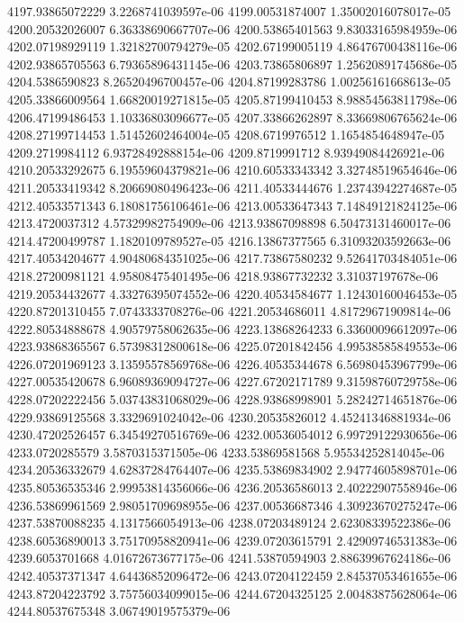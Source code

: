 {4197.93865072229 3.2268741039597e-06
4199.00531874007 1.35002016078017e-05
4200.20532026007 6.36338690667707e-06
4200.53865401563 9.83033165984959e-06
4202.07198929119 1.32182700794279e-05
4202.67199005119 4.86476700438116e-06
4202.93865705563 6.79365896431145e-06
4203.73865806897 1.25620891745686e-05
4204.5386590823 8.26520496700457e-06
4204.87199283786 1.00256161668613e-05
4205.33866009564 1.66820019271815e-05
4205.87199410453 8.98854563811798e-06
4206.47199486453 1.10336803096677e-05
4207.33866262897 8.33669806765624e-06
4208.27199714453 1.51452602464004e-05
4208.6719976512 1.1654854648947e-05
4209.2719984112 6.93728492888154e-06
4209.8719991712 8.93949084426921e-06
4210.20533292675 6.19559604379821e-06
4210.60533343342 3.32748519654646e-06
4211.20533419342 8.20669080496423e-06
4211.40533444676 1.23743942274687e-05
4212.40533571343 6.18081756106461e-06
4213.00533647343 7.14849121824125e-06
4213.4720037312 4.57329982754909e-06
4213.93867098898 6.50473131460017e-06
4214.47200499787 1.1820109789527e-05
4216.13867377565 6.31093203592663e-06
4217.40534204677 4.90480684351025e-06
4217.73867580232 9.52641703484051e-06
4218.27200981121 4.95808475401495e-06
4218.93867732232 3.31037197678e-06
4219.20534432677 4.33276395074552e-06
4220.40534584677 1.12430160046453e-05
4220.87201310455 7.0743333708276e-06
4221.20534686011 4.81729671909814e-06
4222.80534888678 4.90579758062635e-06
4223.13868264233 6.33600096612097e-06
4223.93868365567 6.57398312800618e-06
4225.07201842456 4.99538585849553e-06
4226.07201969123 3.13595578569768e-06
4226.40535344678 6.56980453967799e-06
4227.00535420678 6.96089369094727e-06
4227.67202171789 9.31598760729758e-06
4228.07202222456 5.03743831068029e-06
4228.93868998901 5.28242714651876e-06
4229.93869125568 3.3329691024042e-06
4230.20535826012 4.45241346881934e-06
4230.47202526457 6.34549270516769e-06
4232.00536054012 6.99729122930656e-06
4233.0720285579 3.5870315371505e-06
4233.53869581568 5.95534252814045e-06
4234.20536332679 4.62837284764407e-06
4235.53869834902 2.94774605898701e-06
4235.80536535346 2.99953814356066e-06
4236.20536586013 2.40222907558946e-06
4236.53869961569 2.98051709698955e-06
4237.00536687346 4.30923670275247e-06
4237.53870088235 4.1317566054913e-06
4238.07203489124 2.62308339522386e-06
4238.60536890013 3.75170958820941e-06
4239.07203615791 2.42909746531383e-06
4239.6053701668 4.01672673677175e-06
4241.53870594903 2.88639967624186e-06
4242.40537371347 4.64436852096472e-06
4243.07204122459 2.84537053461655e-06
4243.87204223792 3.75756034099015e-06
4244.67204325125 2.00483875628064e-06
4244.80537675348 3.06749019575379e-06
}
